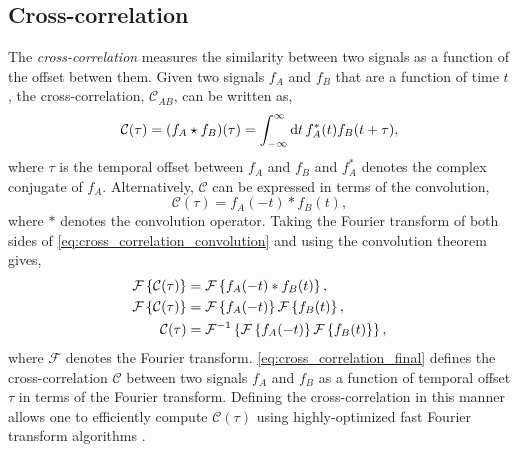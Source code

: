 \subsection{Cross-correlation}

The \textit{cross-correlation} measures the similarity between two signals as a function of the offset betwen them. Given two signals $f_A$ and $f_B$ that are a function of time $t$, the cross-correlation, $\mathcal{C}_{AB}$, can be written as,
\begin{equation}
    \mathcal{C}(\tau) = (f_A\star f_B)(\tau) = \int_{-\infty}^\infty\textup{d}t\,f_A^{\ast}(t)f_B(t + \tau),
\end{equation}
where $\tau$ is the temporal offset between $f_A$ and $f_B$ and $f_A^{\ast}$ denotes the complex conjugate of $f_A$. Alternatively, $\mathcal{C}$ can be expressed in terms of the convolution,
\begin{equation}\label{eq:cross_correlation_convolution}
    \mathcal{C}(\tau) = f_A(-t) \ast f_B(t),
\end{equation}
where $\ast$ denotes the convolution operator. Taking the Fourier transform of both sides of \autoref{eq:cross_correlation_convolution} and using the convolution theorem \citep[section 20.4]{arfken_mathematical_2013} gives,
\begin{align}\label{eq:cross_correlation_final}
    \mathcal{F}\left\{\mathcal{C}(\tau)\right\} &= \mathcal{F}\left\{f_A(-t) \ast f_B(t)\right\}, \nonumber \\
    \mathcal{F}\left\{\mathcal{C}(\tau)\right\} &= \mathcal{F}\left\{f_A(-t)\right\}\mathcal{F}\left\{f_B(t)\right\}, \nonumber \\
    \mathcal{C}(\tau) &= \mathcal{F}^{-1}\left\{\mathcal{F}\left\{f_A(-t)\right\}\mathcal{F}\left\{f_B(t)\right\}\right\},
\end{align}
where $\mathcal{F}$ denotes the Fourier transform. \autoref{eq:cross_correlation_final} defines the cross-correlation $\mathcal{C}$ between two signals $f_A$ and $f_B$ as a function of temporal offset $\tau$ in terms of the Fourier transform. Defining the cross-correlation in this manner allows one to efficiently compute $\mathcal{C}(\tau)$ using highly-optimized fast Fourier transform algorithms \citep[e.g. the widely-used algorithm developed by][]{cooley_algorithm_1965}.


